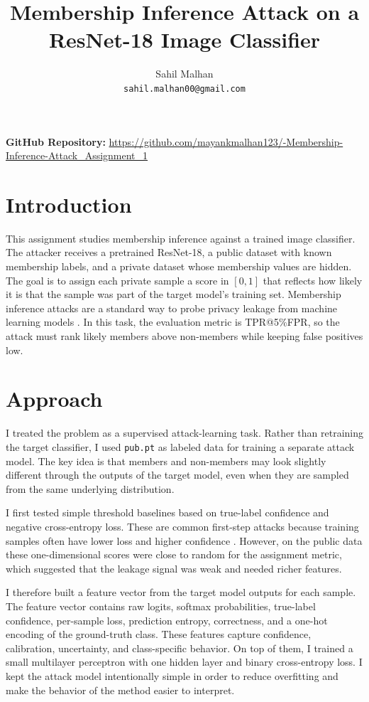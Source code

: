 \documentclass{article} %
\title{Membership Inference Attack on a ResNet-18 Image Classifier}
\author{Sahil Malhan \\
\texttt{sahil.malhan00@gmail.com}}
\begin{document}
\maketitle
\vspace{-1.1em}

\noindent\textbf{GitHub Repository:}
\url{https://github.com/mayankmalhan123/-Membership-Inference-Attack_Assignment_1}

\section{Introduction}

This assignment studies membership inference against a trained image classifier. The attacker receives a pretrained ResNet-18, a public dataset with known membership labels, and a private dataset whose membership values are hidden. The goal is to assign each private sample a score in $[0,1]$ that reflects how likely it is that the sample was part of the target model's training set. Membership inference attacks are a standard way to probe privacy leakage from machine learning models \citep{shokri2017mia,carlini2022firstprinciples}. In this task, the evaluation metric is TPR@5\%FPR, so the attack must rank likely members above non-members while keeping false positives low.

\section{Approach}

I treated the problem as a supervised attack-learning task. Rather than retraining the target classifier, I used \texttt{pub.pt} as labeled data for training a separate attack model. The key idea is that members and non-members may look slightly different through the outputs of the target model, even when they are sampled from the same underlying distribution.

I first tested simple threshold baselines based on true-label confidence and negative cross-entropy loss. These are common first-step attacks because training samples often have lower loss and higher confidence \citep{carlini2022firstprinciples,zarifzadeh2023lowcost}. However, on the public data these one-dimensional scores were close to random for the assignment metric, which suggested that the leakage signal was weak and needed richer features.

I therefore built a feature vector from the target model outputs for each sample. The feature vector contains raw logits, softmax probabilities, true-label confidence, per-sample loss, prediction entropy, correctness, and a one-hot encoding of the ground-truth class. These features capture confidence, calibration, uncertainty, and class-specific behavior. On top of them, I trained a small multilayer perceptron with one hidden layer and binary cross-entropy loss. I kept the attack model intentionally simple in order to reduce overfitting and make the behavior of the method easier to interpret.
\end{document}
